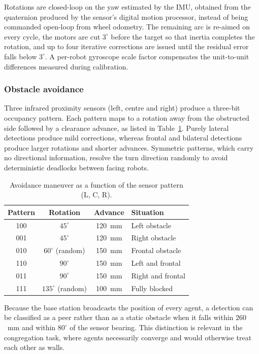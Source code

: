 \documentclass[conference]{IEEEtran}
\begin{document}
Rotations are closed-loop on the yaw estimated by the IMU, obtained from the
quaternion produced by the sensor's digital motion processor, instead of being
commanded open-loop from wheel odometry. The remaining arc is re-aimed on every
cycle, the motors are cut $3^\circ$ before the target so that inertia completes
the rotation, and up to four iterative corrections are issued until the residual
error falls below $3^\circ$. A per-robot gyroscope scale factor compensates the
unit-to-unit differences measured during calibration.

\subsubsection{Obstacle avoidance}
Three infrared proximity sensors (left, centre and right) produce a three-bit
occupancy pattern. Each pattern maps to a rotation away from the obstructed side
followed by a clearance advance, as listed in Table~\ref{tab:avoidance}. Purely
lateral detections produce mild corrections, whereas frontal and bilateral
detections produce larger rotations and shorter advances. Symmetric patterns,
which carry no directional information, resolve the turn direction randomly to
avoid deterministic deadlocks between facing robots.

\begin{table}[htbp]
\caption{Avoidance maneuver as a function of the sensor pattern (L, C, R).}
\label{tab:avoidance}
\centering
\begin{tabular}{cccl}
\hline
\textbf{Pattern} & \textbf{Rotation} & \textbf{Advance} & \textbf{Situation} \\
\hline
100 & $45^\circ$          & 120~mm & Left obstacle \\
001 & $45^\circ$          & 120~mm & Right obstacle \\
010 & $60^\circ$ (random) & 150~mm & Frontal obstacle \\
110 & $90^\circ$          & 150~mm & Left and frontal \\
011 & $90^\circ$          & 150~mm & Right and frontal \\
111 & $135^\circ$ (random)& 100~mm & Fully blocked \\
\hline
\end{tabular}
\end{table}

Because the base station broadcasts the position of every agent, a detection can
be classified as a peer rather than as a static obstacle when it falls within
$260$~mm and within $80^\circ$ of the sensor bearing. This distinction is
relevant in the congregation task, where agents necessarily converge and would
otherwise treat each other as walls.
\end{document}
